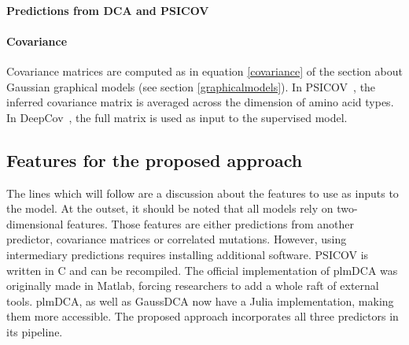             \todo{}

        \paragraph{Predictions from DCA and PSICOV}

            \todo{}

        \paragraph{Covariance}

            Covariance matrices are computed as in equation \ref{covariance} of the section
            about Gaussian graphical models (see section \ref{graphicalmodels}).
            In PSICOV~\cite{doi:10.1093/bioinformatics/btr638}, the inferred covariance
            matrix is averaged across the dimension of amino acid types.
            In DeepCov~\cite{doi:10.1093/bioinformatics/bty341}, the full matrix is used
            as input to the supervised model.

    \subsection{Features for the proposed approach}

        The lines which will follow are a discussion about the features to use as inputs
        to the model. At the outset, it should be noted that all models rely on
        two-dimensional features. Those features are either predictions from another
        predictor, covariance matrices or correlated mutations.
        However, using intermediary predictions requires installing additional software.
        PSICOV is written in C and can be recompiled. The official implementation of
        plmDCA was originally made in Matlab, forcing researchers to add a whole raft
        of external tools. plmDCA, as well as GaussDCA now have a Julia implementation,
        making them more accessible. The proposed approach incorporates all three
        predictors in its pipeline.

        \todo{}

